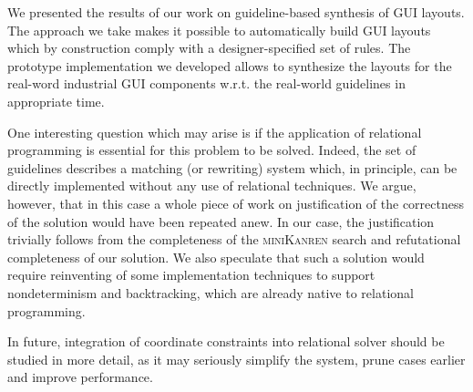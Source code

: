 
We presented the results of our work on guideline-based synthesis of GUI layouts. The approach we take makes it possible to
automatically build GUI layouts which by construction comply with a designer-specified set of rules. The prototype implementation
we developed allows to synthesize the layouts for the real-word industrial GUI components w.r.t. the real-world guidelines in
appropriate time.

One interesting question which may arise is if the application of relational programming is essential for this problem to be solved. Indeed, the set of guidelines
describes a matching (or rewriting) system which, in principle, can be directly implemented without any use of relational techniques. We argue, however,
that in this case a whole piece of work on justification of the correctness of the solution would have been repeated anew. In our
case, the justification trivially follows from the completeness of the \textsc{miniKanren} search and refutational completeness of our solution.
We also speculate that such a solution would require reinventing of some implementation techniques to support nondeterminism and backtracking, which are already native to relational programming.

In future, integration of coordinate constraints into relational solver should be studied in more detail, as it may seriously simplify the system, prune cases earlier and improve performance.





